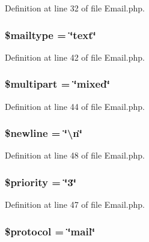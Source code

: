 Definition at line 32 of file Email.\-php.

\subsubsection[{\$mailtype}]{\setlength{\rightskip}{0pt plus 5cm}\$mailtype = \char`\"{}text\char`\"{}}\label{class_c_i___email_a7f4dd7af7642585306869f8985ab744f}


Definition at line 42 of file Email.\-php.

\subsubsection[{\$multipart}]{\setlength{\rightskip}{0pt plus 5cm}\$multipart = \char`\"{}mixed\char`\"{}}\label{class_c_i___email_adc885f76d89c0c495bea0488f29c3104}


Definition at line 44 of file Email.\-php.

\subsubsection[{\$newline}]{\setlength{\rightskip}{0pt plus 5cm}\$newline = \char`\"{}\textbackslash{}n\char`\"{}}\label{class_c_i___email_a8735d5c31c4af1004825e6a28f236aeb}


Definition at line 48 of file Email.\-php.

\subsubsection[{\$priority}]{\setlength{\rightskip}{0pt plus 5cm}\$priority = \char`\"{}3\char`\"{}}\label{class_c_i___email_a2677e505e860db863720ac4e216fd3f2}


Definition at line 47 of file Email.\-php.

\subsubsection[{\$protocol}]{\setlength{\rightskip}{0pt plus 5cm}\$protocol = \char`\"{}mail\char`\"{}}\label{class_c_i___email_ac01bf1cf041487498864d054b991f570}


